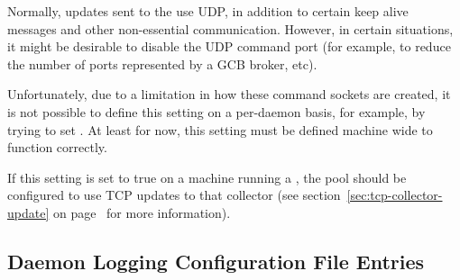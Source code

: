 \begin{description}
  Normally, updates sent to the  use UDP, in
  addition to certain keep alive messages and other non-essential
  communication.
  However, in certain situations, it might be desirable to disable the
  UDP command port (for example, to reduce the number of ports
  represented by a GCB broker, etc).

  Unfortunately, due to a limitation in how these command sockets are
  created, it is not possible to define this setting on a per-daemon
  basis, for example, by trying to set
  .
  At least for now, this setting must be defined machine wide to
  function correctly.

  If this setting is set to true on a machine running a
  , the pool should be configured to use TCP updates
  to that collector (see section~\ref{sec:tcp-collector-update} on
  page~\pageref{sec:tcp-collector-update} for more information).

\end{description}


\subsection{\label{sec:Daemon-Logging-Config-File-Entries}Daemon Logging Configuration File Entries} 

